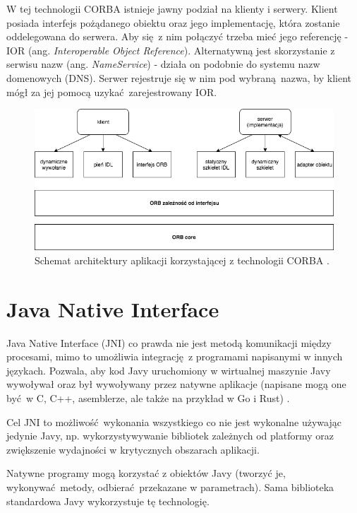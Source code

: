 W tej technologii CORBA istnieje jawny podział na klienty i serwery. Klient posiada interfejs pożądanego obiektu oraz jego implementację, która zostanie oddelegowana do serwera. Aby się z nim połączyć trzeba mieć jego referencję - IOR (ang. \textit{Interoperable Object Reference}). Alternatywną jest skorzystanie z serwisu nazw (ang. \textit{NameService}) - działa on podobnie do systemu nazw domenowych (DNS). Serwer rejestruje się w nim pod wybraną nazwa, by klient mógł za jej pomocą uzykać zarejestrowany IOR.

\begin{figure}[h]
    \centering
    \includegraphics[width=\linewidth]{img/CORBA_architecture.png}
    \caption{Schemat architektury aplikacji korzystającej z technologii CORBA \cite{Saw02}.}
    \label{fig:CORBA_architecture}
\end{figure}


\section{Java Native Interface}

Java Native Interface (JNI) co prawda nie jest metodą komunikacji między procesami, mimo to umożliwia integrację z programami napisanymi w innych językach. Pozwala, aby kod Javy uruchomiony w wirtualnej maszynie Javy wywoływał oraz był wywoływany przez natywne aplikacje (napisane mogą one być w C, C++, asemblerze, ale także na przykład w Go i Rust) \cite{JNI17}.

Cel JNI to możliwość wykonania wszystkiego co nie jest wykonalne używając jedynie Javy, np. wykorzystywywanie bibliotek zależnych od platformy oraz zwiększenie wydajności w krytycznych obszarach aplikacji.

Natywne programy mogą korzystać z obiektów Javy (tworzyć je, wykonywać metody, odbierać przekazane w parametrach). Sama biblioteka standardowa Javy wykorzystuje tę technologię.

